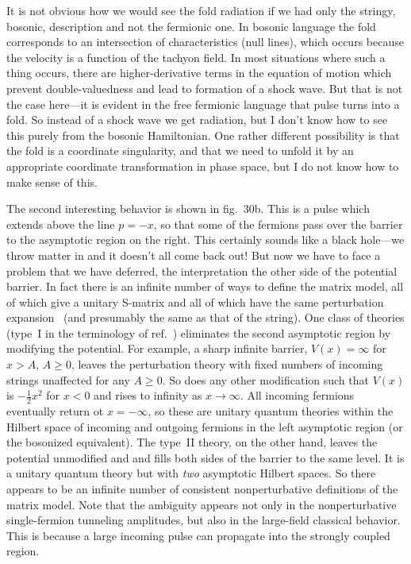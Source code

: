 It is not obvious how we would see the fold
radiation if we had only the stringy, bosonic, description and not
the fermionic one.  In bosonic language the fold corresponds to
an intersection of characteristics (null lines), which occurs
because the velocity is a function of
the tachyon field.  In most situations where such a thing
occurs, there are higher-derivative terms in the equation of
motion which prevent double-valuedness and lead to formation of
a shock wave.  But that is not the case here---it is evident in
the free fermionic language that pulse turns into a fold.
So instead of a shock wave we get radiation, but I don't know
how to see this purely from the bosonic Hamiltonian.
One rather different possibility is that the fold is a coordinate
singularity, and that we need to unfold it by an appropriate
coordinate transformation in phase space, but I do not know how
to make sense of this.

The second interesting behavior is shown in fig.~30b.  This is a
pulse which extends above the line $p = -x$, so that some of the
fermions pass over the barrier to the asymptotic region on the
right.  This certainly sounds like a black hole---we throw
matter in and it doesn't all come back out!  But now we have to
face a problem that we have deferred, the interpretation the other
side of the potential barrier.  In fact there is an infinite number
of ways to define the matrix model, all of which give a unitary
S-matrix and all of which have the same perturbation
expansion~\cite{MPR} (and presumably the same as that of the string).
One class of
theories (type~I in the terminology of ref.~\cite{MPR}) eliminates
the second asymptotic region by modifying the potential.  For
example, a sharp infinite barrier, $V(x) = \infty$ for $x > A$,
$A \geq 0$,
leaves the perturbation theory with fixed numbers of incoming strings
unaffected for any $A \geq 0$.
So does any other modification such that $V(x)$ is
$-\frac{1}{2} x^2$ for
$x < 0$ and rises to infinity as $x \to \infty$.  All incoming fermions
eventually return ot $x = -\infty$, so these are unitary
quantum theories within the Hilbert space of incoming and outgoing
fermions in the left asymptotic region (or the bosonized
equivalent).  The type~II theory, on the other hand, leaves the
potential unmodified and and fills both sides of the barrier to
the same level.  It is a unitary quantum theory but with {\it two}
asymptotic Hilbert spaces.  So there appears to be an infinite number
of consistent nonperturbative definitions of the matrix model.
Note that the ambiguity appears not only in the nonperturbative
single-fermion tunneling amplitudes, but also in the large-field
classical behavior.  This is because a large incoming pulse can
propagate into the strongly coupled region.

